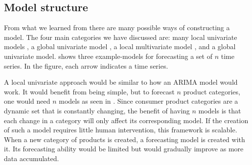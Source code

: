\subsection{Model structure}

From what we learned from 
there are many possible ways of constructing a model.
The four main categories we have discussed are: many local univariate models ,
a global univariate model ,
a local multivariate model , and a global univariate model.
 shows three example-models for forecasting a set of $n$ time series.
In the figure, each arrow indicates a time series.

A local univariate approach would be similar to how an ARIMA model would work.
It would benefit from being simple, but to forecast $n$ product categories,
one would need $n$ models as seen in .
Since consumer product categories are a dynamic set that is constantly changing, the benefit of having
$n$ models is that each change in a category will only affect its corresponding model.
If the creation of such a model requires little human intervention, this framework is scalable.
When a new category of products is created, a forecasting model is created with it. Its forecasting ability
would be limited but would gradually improve as more data accumulated.

